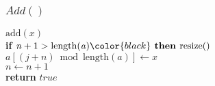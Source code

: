 \documentclass{beamer}
\begin{document}
\begin{frame}
\frametitle{$Add()$}
\begin{oframed}
\begin{flushleft}
\hspace*{1em} $\ensuremath{\mathrm{add}(\ensuremath{\mathit{x}})}$\\
\hspace*{1em} \hspace*{1em} {\color{black} \textbf{if}} $\ensuremath{\ensuremath{\mathit{n}} + 1 > \mathrm{length}(\ensuremath{\mathit{a}})} {\color{black} \textbf{ then }}  \ensuremath{\mathrm{resize}()}$\\
\hspace*{1em} \hspace*{1em} $\ensuremath{\ensuremath{\mathit{a}}[\ensuremath{(\ensuremath{\mathit{j}}+\ensuremath{\mathit{n}}) \bmod  \mathrm{length}(\ensuremath{\mathit{a}})}] \gets  \ensuremath{x}}$\\
\hspace*{1em} \hspace*{1em} $\ensuremath{\ensuremath{\mathit{n}} \gets  \ensuremath{\ensuremath{\mathit{n}} + 1}}$\\
\hspace*{1em} \hspace*{1em} {\color{black} \textbf{return}} $\ensuremath{\ensuremath{\mathit{true}}}$\\
\end{flushleft}
\end{oframed}
\end{frame}
\end{document}
